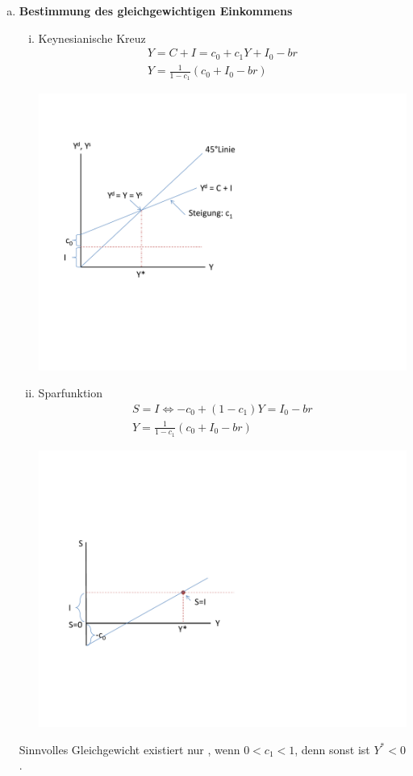 \documentclass{scrartcl}
\begin{document}
\begin{enumerate}[(a)]
\item
\textbf{Bestimmung des gleichgewichtigen Einkommens}
\begin{enumerate}[(i)]
  \item Keynesianische Kreuz
  \begin{align*}
    Y=C+I=c_{0}+c_1 Y + I_{0} -b r\\
    Y= \frac{1}{1-c_1} (c_{0} + I_{0} - b r)
  \end{align*}
  \begin{center}
  \includegraphics[width=.5\textwidth]{Bilder/ISGG1.pdf}
  \end{center}
  \item Sparfunktion
  \begin{align*}
    S=I \Leftrightarrow -c_{0} + (1-c_1)Y = I_{0} -b r\\
    Y= \frac{1}{1-c_1} (c_{0} + I_{0} - b r)
  \end{align*}
    \begin{center}
  \includegraphics[width=.5\textwidth]{Bilder/ISGG2.pdf}
  \end{center}
\end{enumerate}
Sinnvolles Gleichgewicht existiert nur , wenn $0<c_1<1$, denn sonst ist $Y^* <0$.\\


\end{enumerate}
\end{document}
